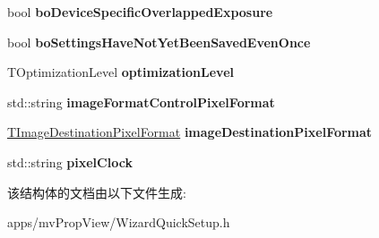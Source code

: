 \begin{DoxyCompactItemize}
\item 
\hypertarget{struct_wizard_quick_setup_1_1_device_settings_acf4f00f32109161d551973e8a96ea08d}{bool {\bfseries bo\+Device\+Specific\+Overlapped\+Exposure}}\label{struct_wizard_quick_setup_1_1_device_settings_acf4f00f32109161d551973e8a96ea08d}

\item 
\hypertarget{struct_wizard_quick_setup_1_1_device_settings_acad0d9d76593f0c4c809ee55836c5be0}{bool {\bfseries bo\+Settings\+Have\+Not\+Yet\+Been\+Saved\+Even\+Once}}\label{struct_wizard_quick_setup_1_1_device_settings_acad0d9d76593f0c4c809ee55836c5be0}

\item 
\hypertarget{struct_wizard_quick_setup_1_1_device_settings_aa57dd478132f7a95b0d4c05c6b2d34ee}{T\+Optimization\+Level {\bfseries optimization\+Level}}\label{struct_wizard_quick_setup_1_1_device_settings_aa57dd478132f7a95b0d4c05c6b2d34ee}

\item 
\hypertarget{struct_wizard_quick_setup_1_1_device_settings_ab6eacdb53b96bbe58465b11d55a053fb}{std\+::string {\bfseries image\+Format\+Control\+Pixel\+Format}}\label{struct_wizard_quick_setup_1_1_device_settings_ab6eacdb53b96bbe58465b11d55a053fb}

\item 
\hypertarget{struct_wizard_quick_setup_1_1_device_settings_a09b862a0e7787b3fb4c099867adb1854}{\hyperlink{group___common_interface_ga02e0fc32ff10e0bc0f2e8b9c321d65c9}{T\+Image\+Destination\+Pixel\+Format} {\bfseries image\+Destination\+Pixel\+Format}}\label{struct_wizard_quick_setup_1_1_device_settings_a09b862a0e7787b3fb4c099867adb1854}

\item 
\hypertarget{struct_wizard_quick_setup_1_1_device_settings_aee4f4aa97130a2fda755f4e8a5d7859b}{std\+::string {\bfseries pixel\+Clock}}\label{struct_wizard_quick_setup_1_1_device_settings_aee4f4aa97130a2fda755f4e8a5d7859b}

\end{DoxyCompactItemize}


该结构体的文档由以下文件生成\+:\begin{DoxyCompactItemize}
\item 
apps/mv\+Prop\+View/Wizard\+Quick\+Setup.\+h\end{DoxyCompactItemize}
